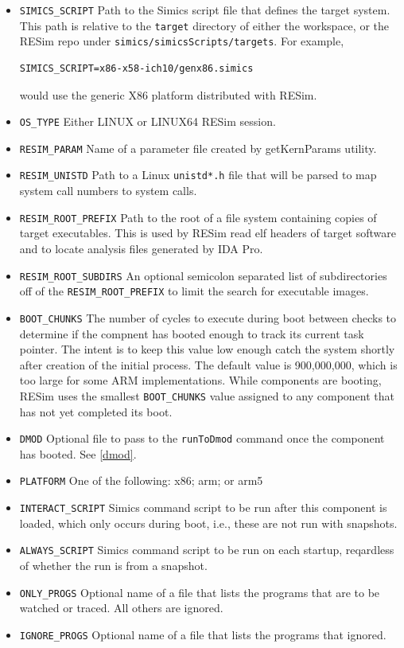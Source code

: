 \documentclass[titlepage]{article}
\begin{document}
\begin{itemize}
\item {\tt SIMICS\_SCRIPT} Path to the Simics script file that defines the target system.  This path is relative to the {\tt target} directory
of either the workspace, or the RESim repo under {\tt simics/simicsScripts/targets}.  For example, 
\begin{verbatim}
SIMICS_SCRIPT=x86-x58-ich10/genx86.simics
\end{verbatim}
\noindent would use the generic X86 platform distributed with RESim.
\item {\tt OS\_TYPE} Either LINUX or LINUX64
RESim session.
\item {\tt RESIM\_PARAM} Name of a parameter file created by getKernParams utility.
\item {\tt RESIM\_UNISTD} Path to a Linux {\tt unistd*.h} file that will be parsed to map system call numbers to system calls.
\item {\tt RESIM\_ROOT\_PREFIX} Path to the root of a file system containing copies of target executables.  This is used by RESim read elf
headers of target software and to locate analysis files generated by IDA Pro. 
\item {\tt RESIM\_ROOT\_SUBDIRS} An optional semicolon separated list of subdirectories off of the {\tt RESIM\_ROOT\_PREFIX} to limit the 
search for executable images.
\item {\tt BOOT\_CHUNKS} The number of cycles to execute during boot between checks to determine if the compnent has booted enough to track
its current task pointer.  The intent is to keep this value low enough catch the system shortly after creation of the initial process.
The default value is 900,000,000, which is too large for some ARM implementations.  While components are booting, RESim uses the smallest
{\tt BOOT\_CHUNKS} value assigned to any component that has not yet completed its boot.
\item {\tt DMOD} Optional file to pass to the {\tt runToDmod} command once the component has booted.  See \ref{dmod}.
\item {\tt PLATFORM} One of the following: x86; arm; or arm5
\item {\tt INTERACT\_SCRIPT} Simics command script to be run after this component is loaded, which only occurs during boot, i.e., these are not run with snapshots.
\item {\tt ALWAYS\_SCRIPT} Simics command script to be run on each startup, reqardless of whether the run is from a snapshot.
\item {\tt ONLY\_PROGS} Optional name of a file that lists the programs that are to be watched or traced.  All others are ignored.
\item {\tt IGNORE\_PROGS} Optional name of a file that lists the programs that ignored.
\end{itemize}
\end{document}
